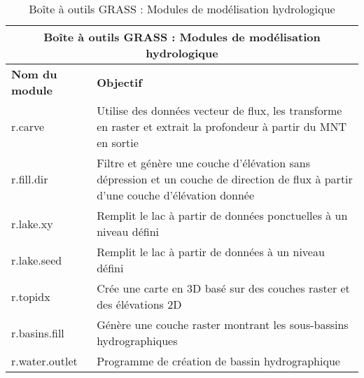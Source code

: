 \begin{table}[H]
\centering
 \begin{tabular}{|p{4cm}|p{10cm}|}
    \hline \multicolumn{2}{|c|}{\textbf{Boîte à outils GRASS : Modules de modélisation hydrologique}} \\
  \hline \textbf{Nom du module} & \textbf{Objectif} \\
  \hline r.carve & Utilise des données vecteur de flux, les transforme en raster et extrait la profondeur à partir du MNT en sortie\\
  \hline r.fill.dir & Filtre et génère une couche d'élévation sans dépression et un couche de direction de flux à partir d'une couche d'élévation donnée \\
  \hline r.lake.xy & Remplit le lac à partir de données ponctuelles à un niveau défini \\
  \hline r.lake.seed & Remplit le lac à partir de données à un niveau défini \\
  \hline r.topidx & Crée une carte en 3D basé sur des couches raster et des élévations 2D \\
  \hline r.basins.fill & Génère une couche raster montrant les sous-bassins hydrographiques \\
  \hline r.water.outlet & Programme de création de bassin hydrographique \\
\hline
\end{tabular}
\caption{Boîte à outils GRASS : Modules de modélisation hydrologique}
\end{table}


